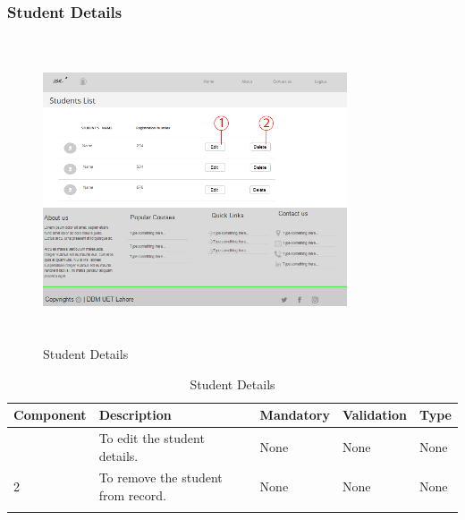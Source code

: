 \documentclass[12pt]{article}
\begin{document}
\subsubsection{Student Details}
\begin{figure}[H]
  \centering
  \includegraphics[width=9cm, height=9cm]{StudentDetails(Admin)}
  \caption{Student Details}
\end{figure}

\begin{longtable}{|>{\raggedright\arraybackslash}p{2.5cm}|>{\raggedright\arraybackslash}p{4cm}|>{\raggedright\arraybackslash}p{2.2cm}|>{\raggedright\arraybackslash}p{2cm}|>{\raggedright\arraybackslash}p{2cm}|}
\hline
\textbf{Component} & \textbf{Description} & \textbf{Mandatory} & \textbf{Validation} & \textbf{Type}\\
\hline
1 &
To edit the student details. &
None &
None &
None \\
\hline

2 &
To remove the student from record. &
None &
None &
None \\
\hline

\caption{Student Details}
\end{longtable}

\newpage
\end{document}
